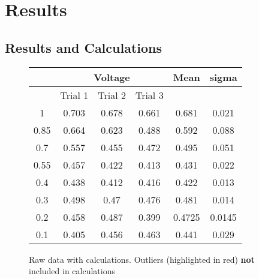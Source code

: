 \documentclass[10.5pt,a4paper]{article}
\begin{document}
\section{Results}
\subsection{Results and Calculations}
\begin{figure}[h]
	\centering
\begin{tabular}{|c|c|c|c|c|c|}
	\hline
	[$CuSO_4$] & \multicolumn{3}{|c|}{Voltage}   & Mean & sigma \\
	\hline
	& Trial 1 & Trial 2 & Trial 3 &  &  \\
	\hline
	1 & 0.703 & 0.678 & 0.661 & 0.681 & 0.021 \\
	\hline
	0.85 & 0.664 & 0.623 & {\color{red} 0.488} & 0.592 & 0.088 \\
	\hline
	0.7 & 0.557 & 0.455 & 0.472 & 0.495 & 0.051 \\
	\hline
	0.55 & 0.457 & 0.422 & 0.413 & 0.431 & 0.022 \\
	\hline
	0.4 & 0.438 & 0.412 & 0.416 & 0.422 & 0.013 \\
	\hline
	0.3 & 0.498 & 0.47 & 0.476 & 0.481 & 0.014 \\
	\hline
	0.2 & 0.458 & 0.487 &  {\color{red}0.399} & 0.4725 & 0.0145 \\
	\hline
	0.1 & 0.405 & 0.456 & 0.463 & 0.441 & 0.029 \\
	\hline
\end{tabular}
\caption{Raw data with calculations. Outliers (highlighted in {\color{red} red}) \textbf{not} included in calculations}

\end{figure}
\end{document}
